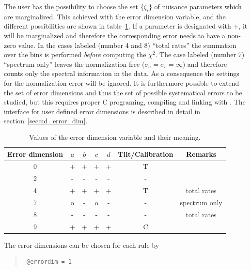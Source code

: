 The user has the possibility to choose the set $\{\zeta_i\}$ of nuisance 
parameters which are marginalized. This achieved with the error dimension 
variable, and the different possibilities are shown in
table~\ref{tab:error_dim}. If a parameter is designated with $+$, it will
be marginalized and therefore the corresponding error needs to have a non-zero
value. In the cases labeled (number 4 and 8) ``total rates'' 
the summation over the bins is performed \emph{before} computing 
the $\chi^2$. The case labeled (number 7) ``spectrum only'' leaves the 
normalization free ($\sigma_a=\sigma_c=\infty$) and therefore counts only the 
spectral information in the data. As a consequence
the settings for the normalization error will be ignored. It is furthermore
possible to extend the set of error dimensions and thus the set of possible 
systematical errors to be studied, but this requires proper C programing, 
compiling and linking with \GLOBES. The interface for user defined error 
dimensions is described in detail in section~\ref{sec:ud_error_dim}.

\begin{center}
\begin{table}[hbt!]
\begin{center}
\begin{tabular}[h]{|c|cccc|c|c|}
\hline
Error dimension&$a$&$b$&$c$&$d$&Tilt/Calibration&Remarks\\
\hline
\hline
0&+&+&+&+&T&\\
2&-&-&-&-&-&\\
4&+&+&+&+&T&total rates\\
7&o&-&o&-&-&spectrum only\\
8&-&-&-&-&-&total rates\\
9&+&+&+&+&C&\\
\hline
\end{tabular}
\caption[Table of error dimensions]{\label{tab:error_dim}
Values of the error dimension variable and their meaning.
 }
\end{center} 
\end{table} 
\end{center}

The error dimensions can be chosen for each rule by
\begin{quote}
{\tt 
\tb @errordim = 1
}
\end{quote}

